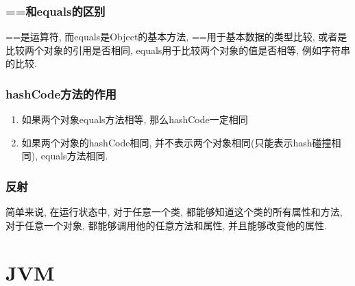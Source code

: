 \documentclass[UTF8]{ctexart}
\begin{document}
\subsubsection{==和equals的区别}
==是运算符, 而equals是Object的基本方法, ==用于基本数据的类型比较, 或者是比较两个对象的引用是否相同, equals用于比较两个对象的值是否相等, 例如字符串的比较.
\subsubsection{hashCode方法的作用}
\begin{enumerate}
	\item 如果两个对象equals方法相等, 那么hashCode一定相同
	\item 如果两个对象的hashCode相同, 并不表示两个对象相同(只能表示hash碰撞相同), equals方法相同.
\end{enumerate}
\subsubsection{反射}
简单来说, 在运行状态中, 对于任意一个类, 都能够知道这个类的所有属性和方法, 对于任意一个对象, 都能够调用他的任意方法和属性, 并且能够改变他的属性. 

\section{JVM}
\end{document}
